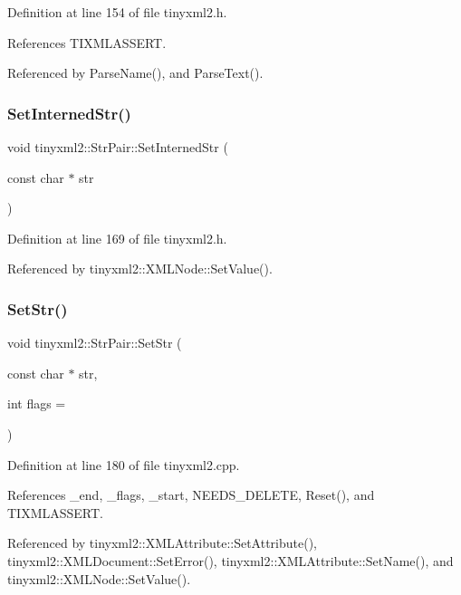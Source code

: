 Definition at line 154 of file tinyxml2.\+h.



References T\+I\+X\+M\+L\+A\+S\+S\+E\+RT.



Referenced by Parse\+Name(), and Parse\+Text().

\mbox{\label{classtinyxml2_1_1_str_pair_a2baf6230e18333e02ab65d0897ee3941}} 
\subsubsection{SetInternedStr()}
{\footnotesize\ttfamily void tinyxml2\+::\+Str\+Pair\+::\+Set\+Interned\+Str (\begin{DoxyParamCaption}\item[{const char $\ast$}]{str }\end{DoxyParamCaption})\hspace{0.3cm}{\ttfamily [inline]}}



Definition at line 169 of file tinyxml2.\+h.



Referenced by tinyxml2\+::\+X\+M\+L\+Node\+::\+Set\+Value().

\mbox{\label{classtinyxml2_1_1_str_pair_a1f82ec6b5bee35ee7466d8565e43b1de}} 
\subsubsection{SetStr()}
{\footnotesize\ttfamily void tinyxml2\+::\+Str\+Pair\+::\+Set\+Str (\begin{DoxyParamCaption}\item[{const char $\ast$}]{str,  }\item[{int}]{flags = {} }\end{DoxyParamCaption})}



Definition at line 180 of file tinyxml2.\+cpp.



References \+\_\+end, \+\_\+flags, \+\_\+start, N\+E\+E\+D\+S\+\_\+\+D\+E\+L\+E\+TE, Reset(), and T\+I\+X\+M\+L\+A\+S\+S\+E\+RT.



Referenced by tinyxml2\+::\+X\+M\+L\+Attribute\+::\+Set\+Attribute(), tinyxml2\+::\+X\+M\+L\+Document\+::\+Set\+Error(), tinyxml2\+::\+X\+M\+L\+Attribute\+::\+Set\+Name(), and tinyxml2\+::\+X\+M\+L\+Node\+::\+Set\+Value().


